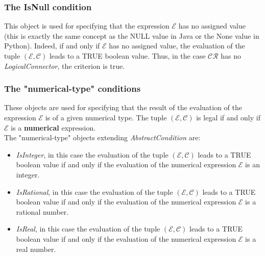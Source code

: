 \documentclass[a4paper,11pt] {ivoa}
\begin{document}
\subsubsection{The IsNull condition}\label{par-IsNull}
This object is used for specifying that the expression $\mathcal E$ has no assigned value (this is
exactly the same concept as the NULL value in Java or the None value in Python).
Indeed, if and only if $\mathcal E$ has no assigned value, the evaluation of the tuple $(\mathcal
E, \mathcal C)$ leads to a TRUE boolean value. Thus, in the case $\mathcal{CR}$ has no {\it
LogicalConnector}, the criterion is true.



\subsubsection{The "numerical-type" conditions}
These objects are used for specifying that the result of the evaluation of the expression $\mathcal
E$ is of a given numerical type. The tuple $(\mathcal E, \mathcal C)$ is legal if and only if
$\mathcal E$ is a {\bf numerical} expression. \\
The "numerical-type" objects extending {\it AbstractCondition}  are:
\begin{itemize}
\item {\it IsInteger}, in this case the evaluation of the tuple $(\mathcal E, \mathcal C)$ leads to
a TRUE boolean value if and only if the evaluation of the numerical expression $\mathcal E$ is an
integer.
\item {\it IsRational}, in this case the evaluation of the tuple $(\mathcal E, \mathcal C)$ leads
to a TRUE boolean value if and only if the evaluation of the numerical expression $\mathcal E$ is a
rational number.
\item {\it IsReal}, in this case the evaluation of the tuple $(\mathcal E, \mathcal C)$ leads to a
TRUE boolean value
if and only if the evaluation of the numerical expression $\mathcal E$ is a real number.
\end{itemize} 
\end{document}
